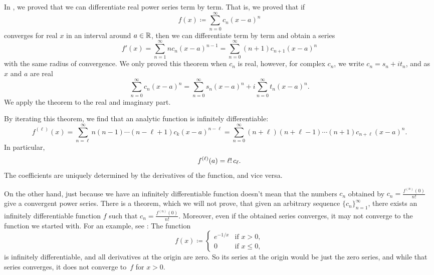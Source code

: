 In , we proved that we can
differentiate real power series term by term.  That is,
we proved that if
\begin{equation*}
f(x) \coloneqq \sum_{n=0}^\infty c_n {(x-a)}^n
\end{equation*}
converges for real $x$ in an interval around $a \in {\mathbb{R}}$, then we can differentiate
term by term and obtain a series
\begin{equation*}
f'(x) =
\sum_{n=1}^\infty n c_n {(x-a)}^{n-1}
=
\sum_{n=0}^\infty (n+1)c_{n+1} {(x-a)}^{n} 
\end{equation*}
with the same radius of convergence.
We only proved this theorem when $c_n$ is real, however, for complex $c_n$,
we write
$c_n = s_n + i t_n$, and as $x$ and $a$ are real
\begin{equation*}
\sum_{n=0}^\infty c_n {(x-a)}^n
=
\sum_{n=0}^\infty s_n {(x-a)}^n
+
i
\sum_{n=0}^\infty t_n {(x-a)}^n .
\end{equation*}
We apply the theorem to the real and
imaginary part.

By iterating this theorem, we find that an
analytic function is infinitely differentiable:
\begin{equation*}
f^{(\ell)}(x) =
\sum_{n=\ell}^\infty n(n-1)\cdots(n-\ell+1)c_k {(x-a)}^{n-\ell}
=
\sum_{n=0}^\infty (n+\ell)(n+\ell-1)\cdots (n+1) c_{n+\ell} {(x-a)}^{n} .
\end{equation*}
In particular,
\begin{equation} \label{eq:formulaforpscoeffs}
f^{(\ell)}(a) = \ell! \, c_\ell .
\avoidbreak
\end{equation}
The coefficients are uniquely determined by the derivatives of the
function, and vice versa.

On the other hand, just because we have an infinitely differentiable
function doesn't mean that the numbers $c_n$ obtained by
$c_n = \frac{f^{(n)}(0)}{n!}$ give a convergent power series.
There is a theorem, which we will not prove,
that given an arbitrary sequence $\{ c_n \}_{n=1}^\infty$, there exists an
infinitely differentiable function $f$ such that
$c_n = \frac{f^{(n)}(0)}{n!}$.  Moreover, even if the obtained series
converges, it may not converge to the function we started with.
For an example,
see :  The
function
\begin{equation*}
f(x) \coloneqq
\begin{cases}
e^{-1/x} & \text{if } x > 0,\\
0        & \text{if } x \leq 0,
\end{cases}
\end{equation*}
is infinitely differentiable, and all derivatives at the origin are zero.
So
its series at the origin would be just the zero series, and while that
series converges, it does not converge to~$f$ for $x > 0$.


